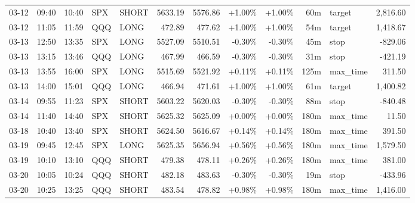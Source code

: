 \documentclass[11pt,a4paper,twoside]{article}
\begin{document}
\begin{center}
\begin{longtable}{>{\color{txtmain}}l l l l l r r r r r >{\color{txtmain}}l r}
03-12 & 09:40 & 10:40 & SPX & SHORT & 5633.19 & 5576.86 & \textcolor{wingreen}{+1.00\%} & \textcolor{wingreen}{+1.00\%} & 60m & target & \textcolor{wingreen}{2,816.60} \\
03-12 & 11:05 & 11:59 & QQQ & LONG & 472.89 & 477.62 & \textcolor{wingreen}{+1.00\%} & \textcolor{wingreen}{+1.00\%} & 54m & target & \textcolor{wingreen}{1,418.67} \\
03-13 & 12:50 & 13:35 & SPX & LONG & 5527.09 & 5510.51 & \textcolor{lossred}{-0.30\%} & \textcolor{lossred}{-0.30\%} & 45m & stop & \textcolor{lossred}{-829.06} \\
03-13 & 13:15 & 13:46 & QQQ & LONG & 467.99 & 466.59 & \textcolor{lossred}{-0.30\%} & \textcolor{lossred}{-0.30\%} & 31m & stop & \textcolor{lossred}{-421.19} \\
03-13 & 13:55 & 16:00 & SPX & LONG & 5515.69 & 5521.92 & \textcolor{wingreen}{+0.11\%} & \textcolor{wingreen}{+0.11\%} & 125m & max\_time & \textcolor{wingreen}{311.50} \\
03-13 & 14:00 & 15:01 & QQQ & LONG & 466.94 & 471.61 & \textcolor{wingreen}{+1.00\%} & \textcolor{wingreen}{+1.00\%} & 61m & target & \textcolor{wingreen}{1,400.82} \\
03-14 & 09:55 & 11:23 & SPX & SHORT & 5603.22 & 5620.03 & \textcolor{lossred}{-0.30\%} & \textcolor{lossred}{-0.30\%} & 88m & stop & \textcolor{lossred}{-840.48} \\
03-14 & 11:40 & 14:40 & SPX & SHORT & 5625.32 & 5625.09 & \textcolor{wingreen}{+0.00\%} & \textcolor{wingreen}{+0.00\%} & 180m & max\_time & \textcolor{wingreen}{11.50} \\
03-18 & 10:40 & 13:40 & SPX & SHORT & 5624.50 & 5616.67 & \textcolor{wingreen}{+0.14\%} & \textcolor{wingreen}{+0.14\%} & 180m & max\_time & \textcolor{wingreen}{391.50} \\
03-19 & 09:45 & 12:45 & SPX & LONG & 5625.35 & 5656.94 & \textcolor{wingreen}{+0.56\%} & \textcolor{wingreen}{+0.56\%} & 180m & max\_time & \textcolor{wingreen}{1,579.50} \\
03-19 & 10:10 & 13:10 & QQQ & SHORT & 479.38 & 478.11 & \textcolor{wingreen}{+0.26\%} & \textcolor{wingreen}{+0.26\%} & 180m & max\_time & \textcolor{wingreen}{381.00} \\
03-20 & 10:05 & 10:24 & QQQ & SHORT & 482.18 & 483.63 & \textcolor{lossred}{-0.30\%} & \textcolor{lossred}{-0.30\%} & 19m & stop & \textcolor{lossred}{-433.96} \\
03-20 & 10:25 & 13:25 & QQQ & SHORT & 483.54 & 478.82 & \textcolor{wingreen}{+0.98\%} & \textcolor{wingreen}{+0.98\%} & 180m & max\_time & \textcolor{wingreen}{1,416.00} \\

\end{longtable}
\end{center}
\end{document}

